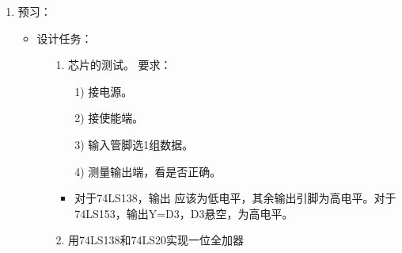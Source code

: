 \documentclass[UTF8]{ctexart}
\begin{document}
\begin{enumerate}
    \large
    \vspace{1\baselineskip}
    \item  预习：
          \begin{itemize}
              \item 设计任务：
                    \begin{itemize}
                        \item [1.]  芯片的测试。
                              要求：
                              \begin{itemize}
                                  \item [1)] 接电源。 
                                  \item [2)] 接使能端。
                                  \item [3)] 输入管脚选1组数据。
                                  \item [4)] 测量输出端，看是否正确。
                                  \item 对于74LS138，输出   应该为低电平，其余输出引脚为高电平。对于74LS153，输出Y=D3，D3悬空，为高电平。
                              \end{itemize}
                        \item [2.]  用74LS138和74LS20实现一位全加器


\end{itemize}
\end{itemize}
\end{enumerate}
\end{document}
